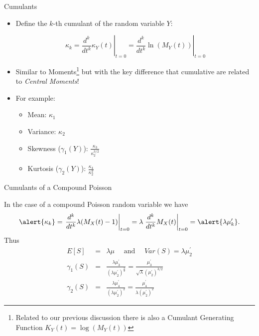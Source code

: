 \documentclass[11pt]{beamer}
\begin{document}
\begin{frame}{Cumulants}

\begin{itemize}

\item Define the $k$-th cumulant of the random variable $Y$:

$$\kappa_k=\left. \frac{d^k}{dt^k} \kappa_Y(t) \right|_{t=0} = \left. \frac{d^k}{dt^k} \ln (M_Y(t)) \right|_{t=0}$$
\vfill
\item Similar to Moments\footnote{Related to our previous discussion there is also a Cumulant Generating Function $K_Y(t) = \log(M_Y(t))$} but with the key difference that cumulative are related to \textit{Central Moments}!
\vfill
\item For example:

\begin{itemize}
\item Mean: $\kappa_1$
\item Variance: $\kappa_2$
\item Skewness ($\gamma_1(Y)$): $\frac{\kappa_3}{\kappa_2^{3/2}}$ 
\item Kurtosis ($\gamma_2(Y)$): $\frac{\kappa_4}{\kappa_2^{2}}$
\end{itemize}

\end{itemize}



\end{frame}
\begin{frame}{Cumulants of a Compound Poisson}

In the case of a compound Poisson random variable we have
$$\alert{\kappa_k}=\left. \frac{d^k}{dt^k} \lambda(M_X(t)-1) \right|_{t=0}=\lambda \left.\frac{d^k}{dt^k} M_X(t)\right|_{t=0}=\alert{\lambda \mu^\prime_k}.$$
Thus
\begin{eqnarray*}
E[S]&=&\lambda \mu \quad\text{ and }\quad Var(S)=\lambda \mu^\prime_2 \\
\gamma_1(S)&=& \frac{\lambda \mu^\prime_3}{(\lambda \mu^\prime_2)^\frac{3}{2}} = \frac{\mu^\prime_3}{\sqrt{\lambda}(\mu^\prime_2)^{3/2}} \\
\gamma_2(S)&=& \frac{\lambda \mu^\prime_4}{(\lambda \mu^\prime_2)^2} = \frac{\mu^\prime_4}{\lambda (\mu^\prime_2)^2}
\end{eqnarray*}

\end{frame}
\end{document}
